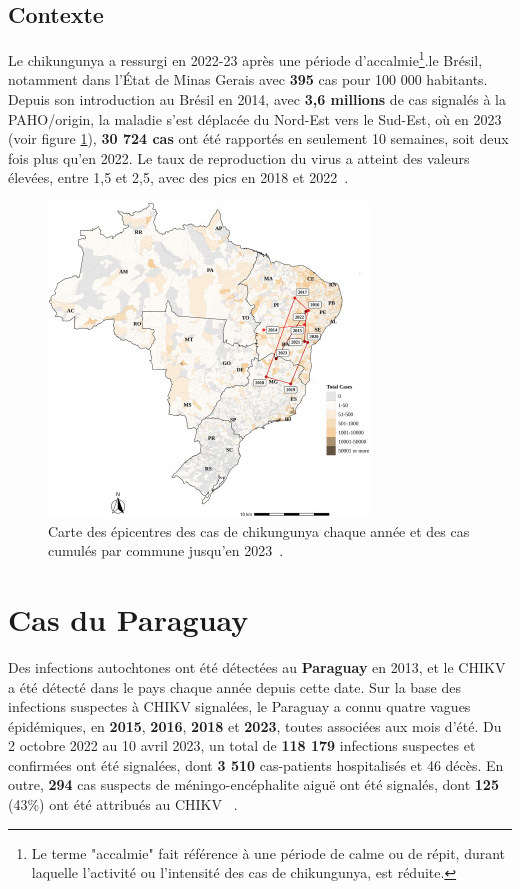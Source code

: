 \subsection{Contexte}
Le chikungunya a ressurgi en 2022-23 après une période d'accalmie\footnote{Le terme "accalmie" fait référence à une période de calme ou de répit, durant laquelle l'activité ou l'intensité des cas de chikungunya, est réduite.}.le Brésil, notamment dans l'État de Minas Gerais avec \textbf{395} cas pour 100 000 habitants. Depuis son introduction au Brésil en 2014, avec\textbf{ 3,6 millions} de cas signalés à la PAHO/origin, la maladie s'est déplacée du Nord-Est vers le Sud-Est, où en 2023 (voir figure \ref{fig:mapcasesbrazil}), \textbf{30 724 cas} ont été rapportés en seulement 10 semaines, soit deux fois plus qu'en 2022. Le taux de reproduction du virus a atteint des valeurs élevées, entre 1,5 et 2,5, avec des pics en 2018 et 2022~\cite{Ferreira_de_Almeida2023-et}.
\begin{figure}[h!]
	\centering
	\includegraphics[width=0.6\linewidth]{images/map_cases_brazil}
	\caption{Carte des épicentres des cas de chikungunya chaque année et des cas cumulés par commune jusqu'en 2023~\cite{expansion_chikungunya_brazil}.}
	\label{fig:mapcasesbrazil}
\end{figure}
\newpage
\section{Cas du Paraguay}
Des infections autochtones ont été détectées au \textbf{Paraguay} en 2013, et le CHIKV a été détecté dans le pays chaque année depuis cette date. Sur la base des infections suspectes à CHIKV signalées, le Paraguay a connu quatre vagues épidémiques, en \textbf{2015}, \textbf{2016}, \textbf{2018} et \textbf{2023}, toutes associées aux mois d'été. Du 2 octobre 2022 au 10 avril 2023, un total de \textbf{118 179 }infections suspectes et confirmées ont été signalées, dont\textbf{ 3 510 }cas-patients hospitalisés et 46 décès. En outre, \textbf{294} cas suspects de méningo-encéphalite aiguë ont été signalés, dont \textbf{125} (43\%) ont été attribués au CHIKV ~\cite{giovanetti2023rapid}.
